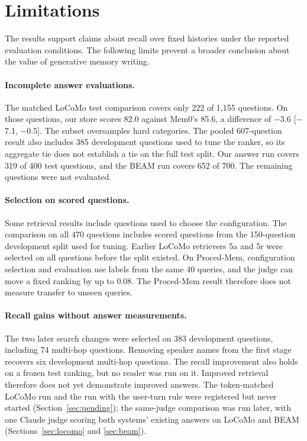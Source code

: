 \section{Limitations}
\label{sec:limitations}

The results support claims about recall over fixed histories under the reported evaluation conditions. The following limits prevent a broader conclusion about the value of generative memory writing.

\paragraph{Incomplete answer evaluations.} The matched LoCoMo test comparison covers only 222 of 1,155 questions. On those questions, our store scores 82.0 against Mem0's 85.6, a difference of $-$3.6 [$-$7.1, $-$0.5]. The subset oversamples hard categories. The pooled 607-question result also includes 385 development questions used to tune the ranker, so its aggregate tie does not establish a tie on the full test split. Our \lmes{} answer run covers 319 of 400 test questions, and the BEAM run covers 652 of 700. The remaining questions were not evaluated.

\paragraph{Selection on scored questions.} Some retrieval results include questions used to choose the configuration. The \lmes{} comparison on all 470 questions includes scored questions from the 150-question development split used for tuning. Earlier LoCoMo retrievers 5a and 5r were selected on all questions before the split existed. On Proced-Mem, configuration selection and evaluation use labels from the same 40 queries, and the judge can move a fixed ranking by up to 0.08. The Proced-Mem result therefore does not measure transfer to unseen queries.

\paragraph{Recall gains without answer measurements.} The two later search changes were selected on 383 development questions, including 74 multi-hop questions. Removing speaker names from the first stage recovers six development multi-hop questions. The recall improvement also holds on a frozen test ranking, but no reader was run on it. Improved retrieval therefore does not yet demonstrate improved answers. The token-matched LoCoMo run and the \lmes{} run with the user-turn rule were registered but never started (Section~\ref{sec:pending}); the same-judge comparison was run later, with one Claude judge scoring both systems' existing answers on LoCoMo and BEAM (Sections~\ref{sec:locomo} and \ref{sec:beam}).

